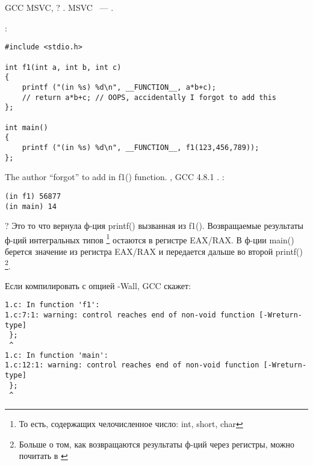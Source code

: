 ﻿\section{}

  \InENRU GCC 
\OrENRU {} \InENRU MSVC, ?
.
  \OrENRU {} 
\InENRU MSVC ~--- 
.

:

\begin{lstlisting}
#include <stdio.h>

int f1(int a, int b, int c)
{
	printf ("(in %s) %d\n", __FUNCTION__, a*b+c);
	// return a*b+c; // OOPS, accidentally I forgot to add this
};

int main()
{
	printf ("(in %s) %d\n", __FUNCTION__, f1(123,456,789));
};
\end{lstlisting}

{The author ``forgot'' to add  in f1() function}.
, GCC 4.8.1 .
:

\begin{lstlisting}
(in f1) 56877
(in main) 14
\end{lstlisting}

?
Это то что вернула ф-ция printf() вызванная из f1().
Возвращаемые результаты ф-ций интегральных типов
\footnote{То есть, содержащих челочисленное число: int, short, char}
остаются в регистре EAX/RAX.
В ф-ции main() берется значение из регистра EAX/RAX и передается дальше во второй printf()
\footnote{Больше о том, как возвращаются результаты ф-ций через регистры, можно почитать в \cite{REBook}}.

Если компилировать с опцией -Wall, GCC скажет:

\begin{lstlisting}
1.c: In function 'f1':
1.c:7:1: warning: control reaches end of non-void function [-Wreturn-type]
 };
 ^
1.c: In function 'main':
1.c:12:1: warning: control reaches end of non-void function [-Wreturn-type]
 };
 ^
\end{lstlisting}

